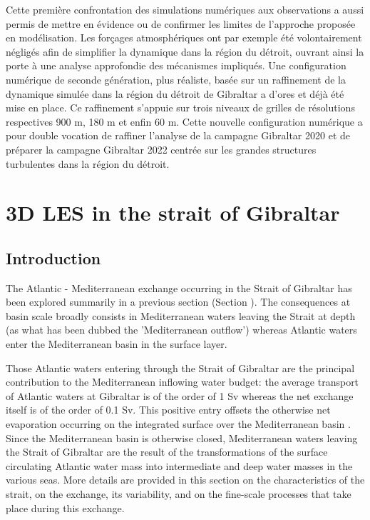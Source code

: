 Cette première confrontation des simulations numériques aux observations a aussi permis de mettre en évidence ou de confirmer les limites de l'approche proposée en modélisation. Les forçages atmosphériques ont par exemple été volontairement négligés afin de simplifier la dynamique dans la région du détroit, ouvrant ainsi la porte à une analyse approfondie des mécanismes impliqués. Une configuration numérique de seconde génération, plus réaliste, basée sur un raffinement de la dynamique simulée dans la région du détroit de Gibraltar a d'ores et déjà été mise en place. Ce raffinement s'appuie sur trois niveaux de grilles de résolutions respectives 900 m, 180 m et enfin 60 m. Cette nouvelle configuration numérique a pour double vocation de raffiner l'analyse de la campagne Gibraltar 2020 et de préparer la campagne Gibraltar 2022 centrée sur les grandes structures turbulentes dans la région du détroit.


\section{3D LES in the strait of Gibraltar}
\label{sectionSim3D}
\subsection{Introduction}
\label{IntroSim3D}

The Atlantic - Mediterranean exchange occurring in the Strait of Gibraltar has been explored summarily in a previous section (Section ). The consequences at basin scale broadly consists in Mediterranean waters leaving the Strait at depth (as what has been dubbed the 'Mediterranean outflow') whereas Atlantic waters enter the Mediterranean basin in the surface layer.

Those Atlantic waters entering through the Strait of Gibraltar are the principal contribution to the Mediterranean inflowing water budget: the average transport of Atlantic waters at Gibraltar is of the order of 1 Sv whereas the net exchange itself is of the order of 0.1 Sv. This positive entry offsets the otherwise net evaporation occurring on the integrated surface over the Mediterranean basin \citep{Bryden94}.
Since the Mediterranean basin is otherwise closed, Mediterranean waters leaving the Strait of Gibraltar are the result of the transformations of the surface circulating Atlantic water mass into intermediate and deep water masses in the various seas.
More details are provided in this section on the characteristics of the strait, on the exchange, its variability, and on the fine-scale processes that take place during this exchange.


